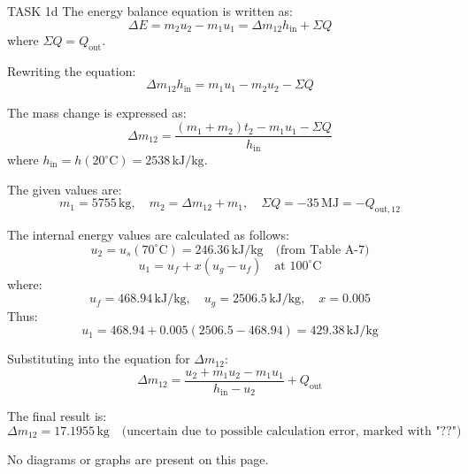 TASK 1d  
The energy balance equation is written as:  
\[
\Delta E = m_2 u_2 - m_1 u_1 = \Delta m_{12} h_{\text{in}} + \Sigma Q
\]  
where \( \Sigma Q = Q_{\text{out}} \).  

Rewriting the equation:  
\[
\Delta m_{12} h_{\text{in}} = m_1 u_1 - m_2 u_2 - \Sigma Q
\]  

The mass change is expressed as:  
\[
\Delta m_{12} = \frac{(m_1 + m_2) t_2 - m_1 u_1 - \Sigma Q}{h_{\text{in}}}
\]  
where \( h_{\text{in}} = h(20^\circ\text{C}) = 2538 \, \text{kJ/kg} \).  

The given values are:  
\[
m_1 = 5755 \, \text{kg}, \quad m_2 = \Delta m_{12} + m_1, \quad \Sigma Q = -35 \, \text{MJ} = -Q_{\text{out},12}
\]  

The internal energy values are calculated as follows:  
\[
u_2 = u_s(70^\circ\text{C}) = 246.36 \, \text{kJ/kg} \quad \text{(from Table A-7)}
\]  
\[
u_1 = u_f + x(u_g - u_f) \quad \text{at } 100^\circ\text{C}
\]  
where:  
\[
u_f = 468.94 \, \text{kJ/kg}, \quad u_g = 2506.5 \, \text{kJ/kg}, \quad x = 0.005
\]  
Thus:  
\[
u_1 = 468.94 + 0.005(2506.5 - 468.94) = 429.38 \, \text{kJ/kg}
\]  

Substituting into the equation for \( \Delta m_{12} \):  
\[
\Delta m_{12} = \frac{u_2 + m_1 u_2 - m_1 u_1}{h_{\text{in}} - u_2} + Q_{\text{out}}
\]  

The final result is:  
\[
\Delta m_{12} = 17.1955 \, \text{kg} \quad \text{(uncertain due to possible calculation error, marked with "??")}
\]  

No diagrams or graphs are present on this page.